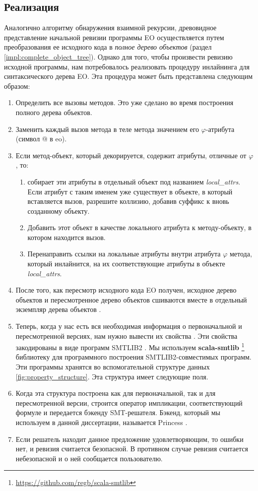 \subsection{Реализация}
Аналогично алгоритму обнаружения взаимной рекурсии, древовидное представление начальной ревизии программы EO осуществляется путем преобразования ее исходного кода в \textit{полное дерево объектов} (раздел \ref{impl:complete_object_tree}). Однако для того, чтобы произвести ревизию исходной программы, нам потребовалось реализовать процедуру инлайнинга для синтаксического дерева EO. Эта процедура может быть представлена следующим образом:
\begin{enumerate}
  \item Определить все вызовы методов. Это уже сделано во время построения полного дерева объектов.
  \item Заменить каждый вызов метода в теле метода значением его $\varphi$-атрибута (символ @ в eo).
  \item Если метод-объект, который декорируется, содержит атрибуты, отличные от $\varphi$, то:
  \begin{enumerate}
    \item собирает эти атрибуты в отдельный объект под названием \textit{local\_attrs}. Если атрибут с таким именем уже существует в объекте, в который вставляется вызов, разрешите коллизию, добавив суффикс к вновь созданному объекту. 
    \item Добавить этот объект в качестве локального атрибута к методу-объекту, в котором находится вызов. 
    \item Перенаправить ссылки на локальные атрибуты внутри атрибута $\varphi$ метода, который инлайнится, на их соответствующие атрибуты в объекте \textit{local\_attrs}.
  \end{enumerate}

  \item После того, как пересмотр исходного кода EO получен, исходное дерево объектов и пересмотренное дерево объектов сшиваются вместе в отдельный экземпляр дерева объектов .

  \item Теперь, когда у нас есть вся необходимая информация о первоначальной и пересмотренной версиях, нам нужно вывести их свойства . Эти свойства закодированы в виде программ SMTLIB2 \cite{smtlib}. Мы используем \textbf{scala-smtlib} \footnote{\url{https://github.com/regb/scala-smtlib}} библиотеку для программного построения SMTLIB2-совместимых программ. Эти программы хранятся во вспомогательной структуре данных \ref{fig:property_structure}. Эта структура имеет следующие поля.
  \item Когда эта структура построена как для первоначальной, так и для пересмотренной версии, строится оператор импликации, соответствующий формуле  и передается бэкенду SMT-решателя. Бэкенд, который мы используем в данной диссертации, называется Princess \cite{princess}.
  \item Если решатель находит данное предложение удовлетворяющим, то ошибки нет, и ревизия считается безопасной. В противном случае ревизия считается небезопасной и о ней сообщается пользователю. 
\end{enumerate}

